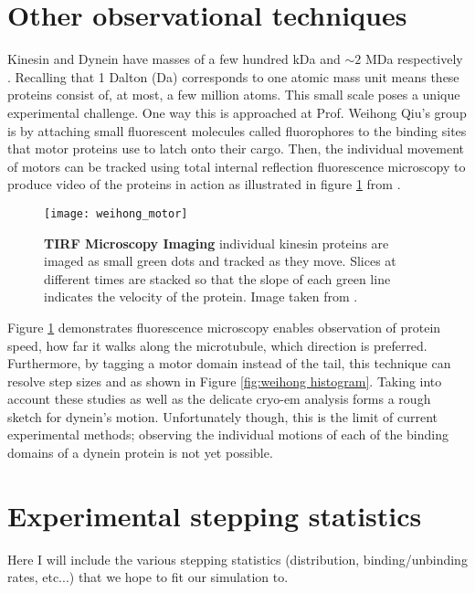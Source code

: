 \section{Other observational techniques} 
 Kinesin and Dynein have masses of a few hundred kDa and  $\sim2$ MDa respectively \cite{liao1998kinesin, johnson1983structure}. Recalling that 1 Dalton (Da) corresponds to one atomic mass unit means these proteins consist of, at most, a few million atoms. This small scale poses a unique experimental challenge. One way this is approached at Prof. Weihong Qiu's group is by attaching small fluorescent molecules called fluorophores to the binding sites that motor proteins use to latch onto their cargo. Then, the individual movement of motors can be tracked using total internal reflection fluorescence microscopy to produce video of the proteins in action as illustrated in figure \ref{fig:weihong tirf} from \cite{qiu2012dynein}. 

\begin{figure}[!hbt]
	\centering
	\texttt{[image: weihong\_motor]}
	\caption{\textbf{TIRF Microscopy Imaging} individual kinesin proteins are imaged as small green dots and tracked as they move. Slices at different times are stacked so that the slope of each green line indicates the velocity of the protein. Image taken from \cite{qiu2012dynein}.}
	\label{fig:weihong tirf}
\end{figure}

Figure \ref{fig:weihong tirf} demonstrates fluorescence microscopy enables observation of protein speed, how far it walks along the microtubule, which direction is preferred. Furthermore, by tagging a motor domain instead of the tail, this technique can resolve step sizes and as shown in Figure \ref{fig:weihong histogram}. \cite{qiu2012dynein} Taking into account these studies as well as the delicate cryo-em analysis forms a rough sketch for dynein's motion. Unfortunately though, this is the limit of current experimental methods; observing the individual motions of each of the binding domains of a dynein protein is not yet possible. 



\section{Experimental stepping statistics}
Here I will include the various stepping statistics (distribution, binding/unbinding rates, etc...) that we hope to fit our simulation to.


